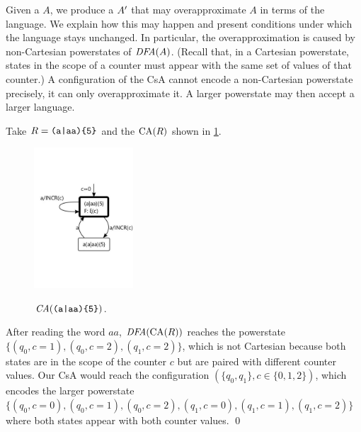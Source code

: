 \documentclass[acmsmall,screen]{acmart}
\begin{document}
Given a {\CA} $A$, we produce a {\CSA} $A'$ that may overapproximate $A$ in
terms of the language. 
%
We explain how this may happen and present conditions under which the language
stays unchanged.
%
In particular, the overapproximation is caused by non-Cartesian powerstates of
$\textit{DFA}(A)$. 
%
(Recall that, in a Cartesian powerstate, states in the scope of a counter must
appear with the same set of values of that counter.)
%
A configuration of the CsA cannot encode a non-Cartesian powerstate precisely,
it can only overapproximate it. 
%
A larger powerstate may then accept a larger language.

\begin{exnoqed}
\label{ex:noncartesian}
\!Take $R = \texttt{(a|aa)\{5\}}$ and the $\textrm{CA}(R)$ shown
in \cref{fig:aoraafive}.
{\makeatletter
\let\par\@@par
\par{}
\everypar{}
\begin{figure}
        \vspace*{-7mm}
        {\includegraphics[width=3.7cm,trim=30 220 0 220,clip]{figures/aoraafive.pdf}}
        \vspace*{-3mm}
        \caption{$\mathit{CA}(\texttt{(a|aa)\{5\}})$.\label{fig:aoraafive}}
\end{figure}
\noindent   
After reading the word $aa$, $\textit{DFA}(\textrm{CA}(R))$
reaches the powerstate $\{(q_0,c=1),(q_0,c=2),(q_1,c=2)\}$,
which is not Cartesian because both states are in the scope of the counter $c$
but are paired with different counter values. Our CsA would reach the
configuration $(\{q_0,q_1\},c\in\{0,1,2\})$, which encodes the larger powerstate
$\{(q_0,c=0),(q_0,c=1),(q_0,c=2),(q_1,c=0),(q_1,c=1),(q_1,c=2)\}$ 
where both states appear with both counter values.
\qed
\par}%
\end{exnoqed}
\end{document}
